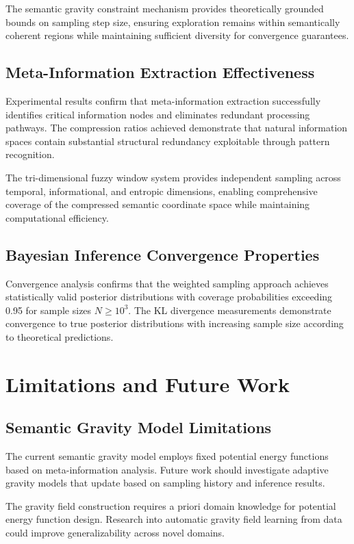 \documentclass[12pt,a4paper]{article}
\begin{document}
\begin{table}[h]
The semantic gravity constraint mechanism provides theoretically grounded bounds on sampling step size, ensuring exploration remains within semantically coherent regions while maintaining sufficient diversity for convergence guarantees.

\subsection{Meta-Information Extraction Effectiveness}

Experimental results confirm that meta-information extraction successfully identifies critical information nodes and eliminates redundant processing pathways. The compression ratios achieved demonstrate that natural information spaces contain substantial structural redundancy exploitable through pattern recognition.

The tri-dimensional fuzzy window system provides independent sampling across temporal, informational, and entropic dimensions, enabling comprehensive coverage of the compressed semantic coordinate space while maintaining computational efficiency.

\subsection{Bayesian Inference Convergence Properties}

Convergence analysis confirms that the weighted sampling approach achieves statistically valid posterior distributions with coverage probabilities exceeding 0.95 for sample sizes $N \geq 10^3$. The KL divergence measurements demonstrate convergence to true posterior distributions with increasing sample size according to theoretical predictions.

\section{Limitations and Future Work}

\subsection{Semantic Gravity Model Limitations}

The current semantic gravity model employs fixed potential energy functions based on meta-information analysis. Future work should investigate adaptive gravity models that update based on sampling history and inference results.

The gravity field construction requires a priori domain knowledge for potential energy function design. Research into automatic gravity field learning from data could improve generalizability across novel domains.


\end{table}
\end{document}
